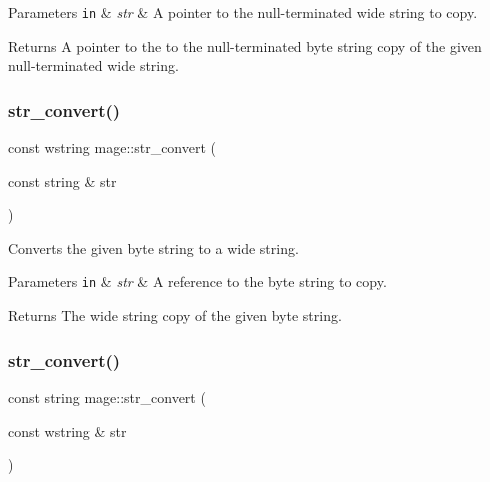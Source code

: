 \begin{DoxyParams}[1]{Parameters}
\mbox{\tt in}  & {\em str} & A pointer to the null-\/terminated wide string to copy. \\
\hline
\end{DoxyParams}
\begin{DoxyReturn}{Returns}
A pointer to the to the null-\/terminated byte string copy of the given null-\/terminated wide string. 
\end{DoxyReturn}
\hypertarget{namespacemage_a9a7ff7b35c293ad8f09d5603f78e4c52}{}\label{namespacemage_a9a7ff7b35c293ad8f09d5603f78e4c52} 
\subsubsection{\texorpdfstring{str\+\_\+convert()}{str\_convert()}\hspace{0.1cm}{\footnotesize\ttfamily [3/4]}}
{\footnotesize\ttfamily const wstring mage\+::str\+\_\+convert (\begin{DoxyParamCaption}\item[{const string \&}]{str }\end{DoxyParamCaption})}

Converts the given byte string to a wide string.


\begin{DoxyParams}[1]{Parameters}
\mbox{\tt in}  & {\em str} & A reference to the byte string to copy. \\
\hline
\end{DoxyParams}
\begin{DoxyReturn}{Returns}
The wide string copy of the given byte string. 
\end{DoxyReturn}
\hypertarget{namespacemage_a5425aab167b483cdf05a6aaf0d074ed1}{}\label{namespacemage_a5425aab167b483cdf05a6aaf0d074ed1} 
\subsubsection{\texorpdfstring{str\+\_\+convert()}{str\_convert()}\hspace{0.1cm}{\footnotesize\ttfamily [4/4]}}
{\footnotesize\ttfamily const string mage\+::str\+\_\+convert (\begin{DoxyParamCaption}\item[{const wstring \&}]{str }\end{DoxyParamCaption})}

